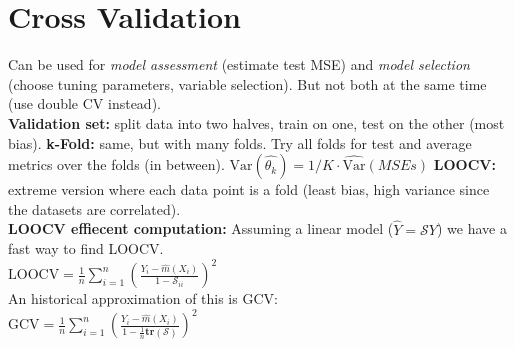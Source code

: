 \section{Cross Validation}
Can be used for \textit{model assessment} (estimate test MSE) and \textit{model selection} (choose tuning parameters, variable selection). But not both at the same time (use double CV instead). \\
\textbf{Validation set:} split data into two halves, train on one, test on the other (most bias).
\textbf{k-Fold:} same, but with many folds. Try all folds for test and average metrics over the folds (in between). $\text{Var}(\hat {\theta_k}) = 1/K \cdot \hat {\text{Var}}(MSEs)$ \textbf{LOOCV:} extreme version where each data point is a fold (least bias, high variance since the datasets are correlated).\\
\textbf{LOOCV effiecent computation:} Assuming a linear model ($\hat Y = \mathcal{S}Y$) we have a fast way to find LOOCV. \\
$\text{LOOCV} = \frac{1}{n}\sum_{i=1}^n\left(\frac{Y_i-\hat m(X_i)}{1-\mathcal{S}_{ii}}\right)^2$\\
An historical approximation of this is GCV:\\
$\text{GCV} = \frac{1}{n}\sum_{i=1}^n\left(\frac{Y_i-\hat m(X_i)}{1-\frac{1}{n}\mathbf{tr}(\mathcal{S})}\right)^2$

